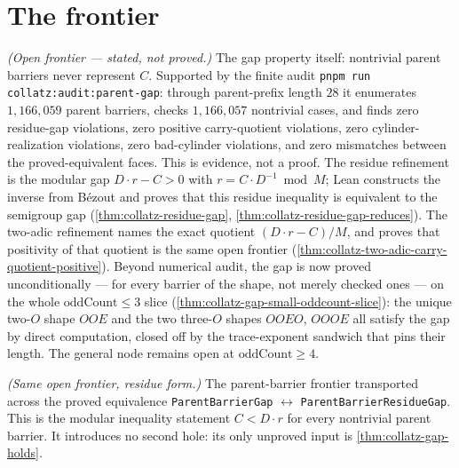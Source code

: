\section{The frontier}

\begin{theorem}
  \label{thm:collatz-gap-holds}
  \notready
  \emph{(Open frontier --- stated, not proved.)} The gap property itself: nontrivial parent
  barriers never represent $C$. Supported by the finite audit
  \texttt{pnpm run collatz:audit:parent-gap}: through parent-prefix length \(28\)
  it enumerates \(1{,}166{,}059\) parent barriers, checks \(1{,}166{,}057\)
  nontrivial cases, and finds zero residue-gap violations, zero positive
  carry-quotient violations, zero cylinder-realization violations, zero
  bad-cylinder violations, and zero mismatches between the proved-equivalent
  faces. This is evidence, not a proof. The residue refinement is the modular gap
  \(D\cdot r-C>0\) with \(r=C\cdot D^{-1}\bmod M\); Lean constructs the inverse
  from B\'ezout and proves that this residue inequality is equivalent to the
  semigroup gap (\cref{thm:collatz-residue-gap},
  \cref{thm:collatz-residue-gap-reduces}). The two-adic refinement names the
  exact quotient \((D\cdot r-C)/M\), and proves that positivity of that quotient
  is the same open frontier (\cref{thm:collatz-two-adic-carry-quotient-positive}).
  Beyond numerical audit, the gap is now proved unconditionally --- for every
  barrier of the shape, not merely checked ones --- on the whole
  $\mathrm{oddCount}\le3$ slice (\cref{thm:collatz-gap-small-oddcount-slice}): the
  unique two-\(O\) shape \(OOE\) and the two three-\(O\) shapes \(OOEO\), \(OOOE\)
  all satisfy the gap by direct computation, closed off by the trace-exponent
  sandwich that pins their length. The general node remains open at
  $\mathrm{oddCount}\ge4$.
\end{theorem}
\begin{theorem}
  \label{thm:collatz-residue-gap-holds}
  \notready
  \emph{(Same open frontier, residue form.)} The parent-barrier frontier transported
  across the proved equivalence \texttt{ParentBarrierGap} \(\leftrightarrow\)
  \texttt{ParentBarrierResidueGap}. This is the modular inequality statement
  \(C<D\cdot r\) for every nontrivial parent barrier. It introduces no second
  hole: its only unproved input is \cref{thm:collatz-gap-holds}.
\end{theorem}
